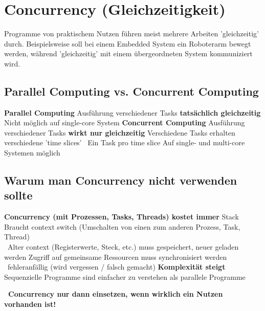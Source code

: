 \section{Concurrency (Gleichzeitigkeit)}

Programme von praktischem Nutzen führen meist mehrere Arbeiten 'gleichzeitig' durch. Beispielsweise soll bei einem Embedded System ein Roboterarm 
bewegt werden, während 'gleichzeitig' mit einem übergeordneten System kommuniziert wird.


\subsection{Parallel Computing vs. Concurrent Computing}


\begin{outline}
    \1 \textbf{Parallel Computing}
        \2 Ausführung verschiedener Tasks \textbf{tatsächlich gleichzeitig}
        \2 Nicht möglich auf single-core System
    \1 \textbf{Concurrent Computing}
        \2 Ausführung verschiedener Tasks \textbf{wirkt nur gleichzeitig}
        \2 Verschiedene Tasks erhalten verschiedene 'time slices' \textrightarrow\ Ein Task pro time slice
        \2 Auf single- und multi-core Systemen möglich
\end{outline}

\columnbreak


\subsection{Warum man Concurrency nicht verwenden sollte}

\begin{outline}
    \1 \textbf{Concurrency (mit Prozessen, Tasks, Threads) kostet immer}
        \2 Stack
        \2 Braucht context switch (Umschalten von einen zum anderen Prozess, Task, Thread) \\
            \textrightarrow\ Alter context (Registerwerte, Steck, etc.) muss gespeichert, neuer geladen werden 
        \2 Zugriff auf gemeinsame Ressourcen muss synchronisiert werden \\
            \textrightarrow\ fehleranfällig (wird vergessen / falsch gemacht)
    \1 \textbf{Komplexität steigt}
        \2 Sequenzielle Programme sind einfacher zu verstehen als parallele Programme
\end{outline}

\vspace{0.1cm}

\textbf{ \textrightarrow\ Concurrency nur dann einsetzen, wenn wirklich ein Nutzen vorhanden ist!}


